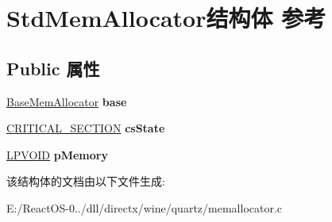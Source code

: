 \hypertarget{struct_std_mem_allocator}{}\section{Std\+Mem\+Allocator结构体 参考}
\label{struct_std_mem_allocator}
\subsection*{Public 属性}
\begin{DoxyCompactItemize}
\item 
\mbox{\label{struct_std_mem_allocator_a38d6edb3b639ca0be76c254c1bac1fba}} 
\hyperlink{struct_base_mem_allocator}{Base\+Mem\+Allocator} {\bfseries base}
\item 
\mbox{\label{struct_std_mem_allocator_a2124bb55e3202bcb94b624b7ae9ad5a6}} 
\hyperlink{struct___c_r_i_t_i_c_a_l___s_e_c_t_i_o_n}{C\+R\+I\+T\+I\+C\+A\+L\+\_\+\+S\+E\+C\+T\+I\+ON} {\bfseries cs\+State}
\item 
\mbox{\label{struct_std_mem_allocator_a6fd0e7b65e67884a94a17e0a33dae25a}} 
\hyperlink{interfacevoid}{L\+P\+V\+O\+ID} {\bfseries p\+Memory}
\end{DoxyCompactItemize}


该结构体的文档由以下文件生成\+:\begin{DoxyCompactItemize}
\item 
E\+:/\+React\+O\+S-\/0../dll/directx/wine/quartz/memallocator.\+c\end{DoxyCompactItemize}
